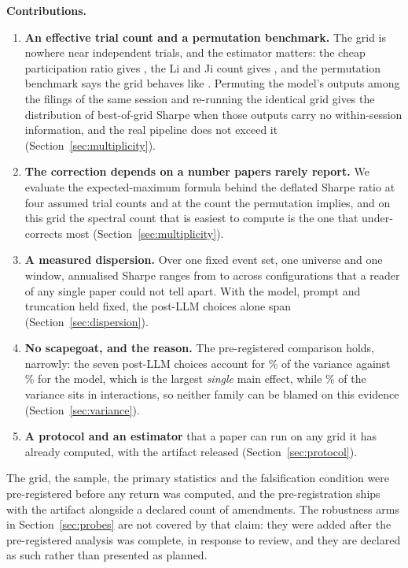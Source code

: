 \documentclass[sigconf]{acmart}
\begin{document}
\medskip\noindent\textbf{Contributions.}
\begin{enumerate}\itemsep1pt
\item \textbf{An effective trial count and a permutation benchmark.} The grid is nowhere near
      \NumConfigs{} independent trials, and the estimator matters: the cheap participation ratio
      gives \Neff{}, the Li and Ji count gives \NeffLiJi{}, and the permutation benchmark says the
      grid behaves like \NImplied{}. Permuting the model's outputs among the filings of the same
      session and re-running the identical grid gives the distribution of best-of-grid Sharpe when
      those outputs carry no within-session information, and the real pipeline does not exceed it
      (Section~\ref{sec:multiplicity}).
\item \textbf{The correction depends on a number papers rarely report.} We evaluate the expected-maximum
      formula behind the deflated Sharpe ratio at four assumed trial counts and at the count the
      permutation implies, and on this grid the spectral count that is easiest to compute is the
      one that under-corrects most (Section~\ref{sec:multiplicity}).
\item \textbf{A measured dispersion.} Over one fixed event set, one universe and one window,
      annualised Sharpe ranges from \SharpeMin{} to \SharpeMax{} across \NumConfigs{} configurations
      that a reader of any single paper could not tell apart. With the model, prompt and truncation
      held fixed, the post-LLM choices alone span \PostOnlyRange{} (Section~\ref{sec:dispersion}).
\item \textbf{No scapegoat, and the reason.} The pre-registered comparison holds, narrowly: the
      seven post-LLM choices account for \VarSharePostLLM{}\% of the variance against
      \VarShareModel{}\% for the model, which is the largest \emph{single} main effect, while
      \VarShareInteractions{}\% of the variance sits in interactions, so neither family can be
      blamed on this evidence (Section~\ref{sec:variance}).
\item \textbf{A protocol and an estimator} that a paper can run on any grid it has already computed,
      with the artifact released (Section~\ref{sec:protocol}).
\end{enumerate}

The grid, the sample, the primary statistics and the falsification condition were pre-registered
before any return was computed, and the pre-registration ships with the artifact alongside a
declared count of \NumAmendments{} amendments. The robustness arms in Section~\ref{sec:probes} are
not covered by that claim: they were added after the pre-registered analysis was complete, in
response to review, and they are declared as such rather than presented as planned.
\end{document}
